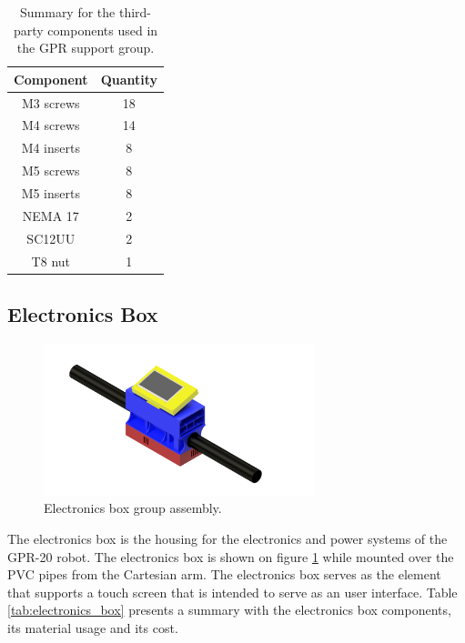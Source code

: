 \documentclass{article}
\begin{document}
\begin{table}[h]
    \centering
    \begin{tabular}{|c|c|}
        \textbf{Component} & \textbf{Quantity} \\ \hline
        M3 screws & 18 \\
        M4 screws & 14 \\
        M4 inserts & 8 \\
        M5 screws & 8 \\
        M5 inserts & 8 \\
        NEMA 17 & 2 \\
        SC12UU & 2 \\
        T8 nut & 1 \\
    \end{tabular}
    \caption{Summary for the third-party components used in the GPR support group. }
    \label{tab:gpr_third_party}
\end{table}

\clearpage
\subsection{Electronics Box}

\begin{figure}[h]
    \centering
    \includegraphics[width=0.7\textwidth]{images/groups/electronics_box.png}
    \caption{Electronics box group assembly.}
    \label{fig:electronics_box_assembly}
\end{figure}

The electronics box is the housing for the electronics and power systems of the GPR-20 robot. The electronics box is shown on figure \ref{fig:electronics_box_assembly} while mounted over the PVC pipes from the Cartesian arm. The electronics box serves as the element that supports a touch screen that is intended to serve as an user interface. Table \ref{tab:electronics_box} presents a summary with the electronics box components, its material usage and its cost.
\end{document}

